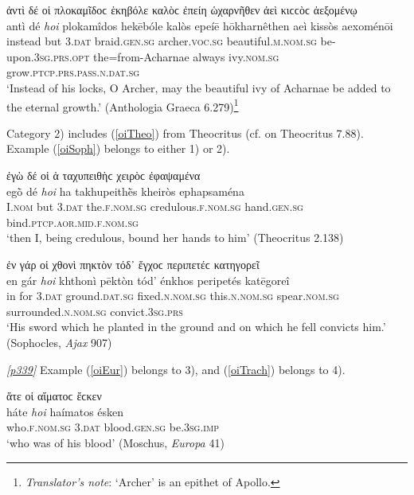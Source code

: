 \begin{exe}
\ex ἀντὶ δέ {οἱ} πλοκαμῖδοϲ ἑκηβόλε καλὸϲ {ἐπείη} ὡχαρνῆθεν ἀεὶ κιϲϲὸϲ ἀεξομένῳ\\
\gll antì dé \emph{hoi} plokamîdos hekēbóle kalòs {epeíē} hōkharnêthen aeì kissòs aexoménōi\\
instead but \textsc{3.dat} braid.\textsc{gen.sg} archer.\textsc{voc.sg} beautiful.\textsc{m.nom.sg} be-upon.\textsc{3sg.prs.opt} the=from-Acharnae always ivy.\textsc{nom.sg} grow.\textsc{ptcp.prs.pass.n.dat.sg}\\
\trans `Instead of his locks, O Archer, may the beautiful ivy of Acharnae be added to the eternal growth.' (Anthologia Graeca 6.279)\footnote{\emph{Translator's note}: `Archer' is an epithet of Apollo.}
\label{oiEuph}
\end{exe}

Category 2) includes (\ref{oiTheo}) from Theocritus (cf. \citealp[256]{Meineke1856} on Theocritus 7.88). Example (\ref{oiSoph}) belongs to either 1) or 2).

\begin{exe}
\ex ἐγὼ δέ {οἱ} ἁ ταχυπειθὴϲ {χειρὸϲ} ἐφαψαμένα\\
\gll egṑ dé \emph{hoi} ha takhupeithḕs {kheiròs} ephapsaména\\
I.\textsc{nom} but \textsc{3.dat} the.\textsc{f.nom.sg} credulous.\textsc{f.nom.sg} hand.\textsc{gen.sg} bind.\textsc{ptcp.aor.mid.f.nom.sg}\\
\trans `then I, being credulous, bound her hands to him' (Theocritus 2.138)
\label{oiTheo}
\end{exe}

\begin{exe}
\ex ἐν γάρ {οἱ} χθονὶ {πηκτὸν τόδ᾽ ἔγχοϲ} περιπετέϲ κατηγορεῖ\\
\gll en gár \emph{hoi} khthonì {pēktòn} {tód'} {énkhos} peripetés katēgoreî\\
in for \textsc{3.dat} ground.\textsc{dat.sg} fixed.\textsc{n.nom.sg} this.\textsc{n.nom.sg} spear.\textsc{nom.sg} surrounded.\textsc{n.nom.sg} convict.\textsc{3sg.prs}\\
\trans `His sword which he planted in the ground and on which he fell convicts him.' (Sophocles, \emph{Ajax} 907)
\label{oiSoph}
\end{exe}

\hyperlink{p339}{\emph{[p339]}} Example (\ref{oiEur}) belongs to 3), and (\ref{oiTrach}) belongs to 4).

\begin{exe}
\ex ἅτε {οἱ} αἵματοϲ ἔϲκεν\\
\gll háte \emph{hoi} haímatos ésken\\
who.\textsc{f.nom.sg} \textsc{3.dat} blood.\textsc{gen.sg} be.\textsc{3sg.imp}\\
\trans `who was of his blood' (Moschus, \emph{Europa} 41)
\label{oiEur}
\end{exe}

